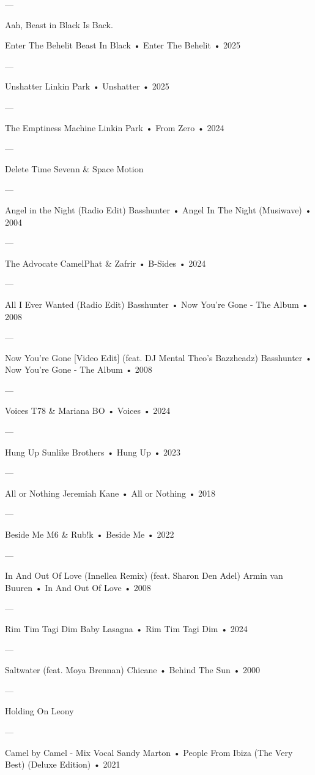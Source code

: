 —

Aah, Beast in Black Is Back.

Enter The Behelit
Beast In Black
 •
Enter The Behelit
 • 2025

—

Unshatter
Linkin Park
 •
Unshatter
 • 2025

—

The Emptiness Machine
Linkin Park
 •
From Zero
 • 2024

—

Delete Time
Sevenn & Space Motion

—

Angel in the Night (Radio Edit)
Basshunter
 •
Angel In The Night (Musiwave)
 • 2004

—

The Advocate
CamelPhat
 &
Zafrir
 •
B-Sides
 • 2024

—

All I Ever Wanted (Radio Edit)
Basshunter
 •
Now You're Gone - The Album
 •
2008

—

Now You're Gone [Video Edit] (feat. DJ Mental Theo's Bazzheadz)
Basshunter
 •
Now You're Gone - The Album
 •
2008

—

Voices
T78
 &
Mariana BO
 •
Voices
 • 2024

—

Hung Up
Sunlike Brothers
 •
Hung Up
 • 2023

—

All or Nothing
Jeremiah Kane
 •
All or Nothing
 • 2018

—

Beside Me
M6
 &
Rub!k
 •
Beside Me
 • 2022



—

In And Out Of Love (Innellea Remix) (feat. Sharon Den Adel)
Armin van Buuren
 •
In And Out Of Love
 • 2008

—

Rim Tim Tagi Dim
Baby Lasagna
 •
Rim Tim Tagi Dim
 • 2024

—

Saltwater (feat. Moya Brennan)
Chicane
 •
Behind The Sun
 • 2000


—

Holding On
Leony


—

Camel by Camel - Mix Vocal
Sandy Marton
 •
People From Ibiza (The Very Best) (Deluxe Edition)
 •
2021



